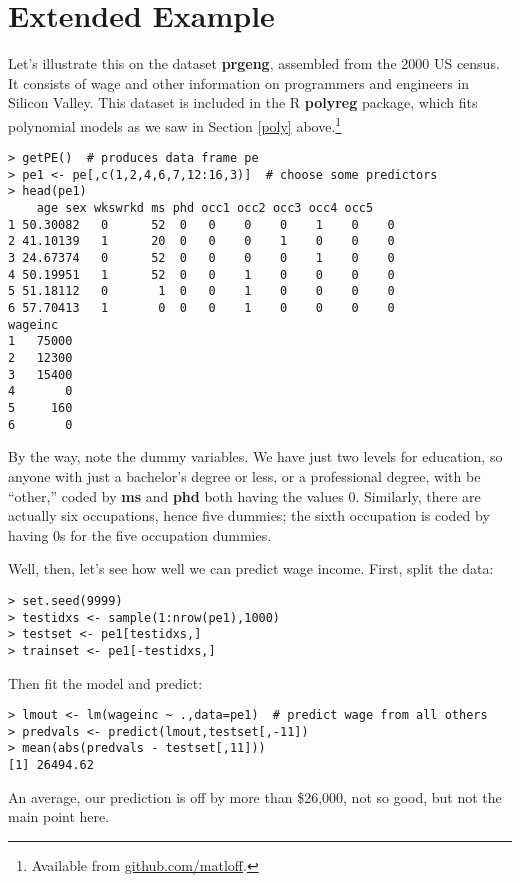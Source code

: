 \section{Extended Example}
\label{prgengex}

Let's illustrate this on the dataset \textbf{prgeng}, assembled from the
2000 US census.  It consists of wage and other information on programmers and
engineers in Silicon Valley.  This dataset is included in the R
\textbf{polyreg} package, which fits polynomial models as we saw in
Section \ref{poly} above.\footnote{Available from
\url{github.com/matloff}.}

\begin{lstlisting}
> getPE()  # produces data frame pe
> pe1 <- pe[,c(1,2,4,6,7,12:16,3)]  # choose some predictors
> head(pe1)
    age sex wkswrkd ms phd occ1 occ2 occ3 occ4 occ5
1 50.30082   0      52  0   0    0    0    1    0    0
2 41.10139   1      20  0   0    0    1    0    0    0
3 24.67374   0      52  0   0    0    0    1    0    0
4 50.19951   1      52  0   0    1    0    0    0    0
5 51.18112   0       1  0   0    1    0    0    0    0
6 57.70413   1       0  0   0    1    0    0    0    0
wageinc
1   75000
2   12300
3   15400
4       0
5     160
6       0
\end{lstlisting}

By the way, note the dummy variables.  We have just two levels for
education, so anyone with just a bachelor's degree or less, or a
professional degree, with be ``other,'' coded by \textbf{ms} and
\textbf{phd} both having the values 0.  Similarly, there are actually
six occupations, hence five dummies; the sixth occupation is coded by
having 0s for the five occupation dummies.

Well, then, let's see how well we can predict wage income. First, split
the data:

\begin{lstlisting}
> set.seed(9999)
> testidxs <- sample(1:nrow(pe1),1000)
> testset <- pe1[testidxs,]
> trainset <- pe1[-testidxs,]
\end{lstlisting}

Then fit the model and predict:

\begin{lstlisting}
> lmout <- lm(wageinc ~ .,data=pe1)  # predict wage from all others
> predvals <- predict(lmout,testset[,-11])
> mean(abs(predvals - testset[,11]))
[1] 26494.62
\end{lstlisting}

An average, our prediction is off by more than \$26,000, not so good,
but not the main point here.

